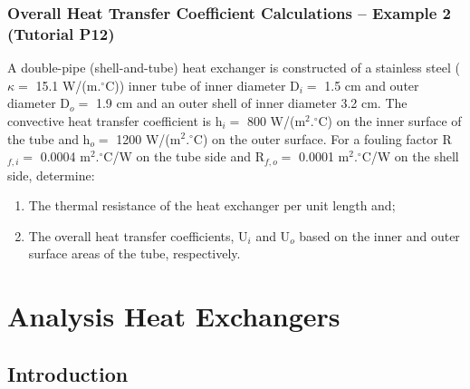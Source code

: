 \documentclass[10pt,compress,unknownkeysallowed]{beamer}
\begin{document}
\begin{frame}
  \frametitle{Overall Heat Transfer Coefficient Calculations -- Example 2 (Tutorial P12)}

A double-pipe (shell-and-tube) heat exchanger is constructed of a stainless steel ($\kappa=$ 15.1 W/(m.$^{\circ}$C)) inner tube of inner diameter D$_{i}=$ 1.5 cm and outer diameter D$_{o}=$ 1.9 cm and an outer shell of inner diameter 3.2 cm. The convective heat transfer coefficient is h$_{i}=$ 800 W/(m$^{2}.^{\circ}$C) on the inner surface of the tube and h$_{o}=$ 1200 W/(m$^{2}.^{\circ}$C) on the outer surface. For a fouling factor R$_{f,i}=$ 0.0004 m$^{2}.^{\circ}$C/W on the tube side and R$_{f,o}=$ 0.0001 m$^{2}.^{\circ}$C/W on the shell side, determine:
\begin{enumerate}
   \item The thermal resistance of the heat exchanger per unit length and; 
   \item The overall heat transfer coefficients, U$_{i}$ and U$_{o}$ based on the inner and outer surface areas of the tube, respectively.
\end{enumerate}

\end{frame}


\section{Analysis Heat Exchangers}

\subsection{Introduction}
\end{document}

